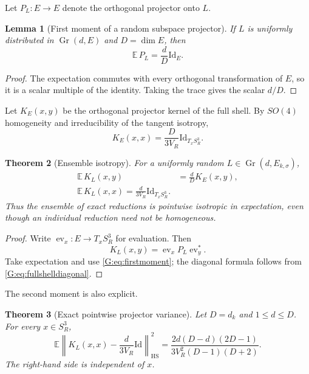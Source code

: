 \documentclass[
 aps,
 prd,
 reprint,
 amsmath,
 amssymb,
 nofootinbib,
 superscriptaddress
]{revtex4-2}
\newtheorem{theorem}{Theorem}[section]
\newtheorem{lemma}[theorem]{Lemma}
\theoremstyle{definition}
\theoremstyle{remark}
\newcommand{\Sthree}{S^3_R}
\newcommand{\Id}{\mathrm{Id}}
\newcommand{\Gr}{\operatorname{Gr}}
\newcommand{\HS}{\mathrm{HS}}
\begin{document}
Let $P_L:E\to E$ denote the orthogonal projector onto $L$.

\begin{lemma}[First moment of a random subspace projector]
\label{G:lem:firstmoment}
If $L$ is uniformly distributed in $\Gr(d,E)$ and $D=\dim E$, then
\begin{equation}
       \mathbb E\,P_L=\frac{d}{D}\Id_E.
       \label{G:eq:firstmoment}
\end{equation}
\end{lemma}

\begin{proof}
The expectation commutes with every orthogonal transformation of $E$, so it
is a scalar multiple of the identity.  Taking the trace gives the scalar
$d/D$.
\end{proof}

Let $K_E(x,y)$ be the orthogonal projector kernel of the full shell.  By
$SO(4)$ homogeneity and irreducibility of the tangent isotropy,
\begin{equation}
       K_E(x,x)
       =
       \frac{D}{3V_R}\Id_{T_x\Sthree}.
       \label{G:eq:fullshelldiagonal}
\end{equation}

\begin{theorem}[Ensemble isotropy]
\label{G:thm:ensembleisotropy}
For a uniformly random $L\in\Gr(d,E_{k,\sigma})$,
\begin{align}
 \mathbb E\,K_L(x,y)
 &=
 \frac{d}{D}K_E(x,y),
 \label{G:eq:meankernel}\\
 \boxed{
 \mathbb E\,K_L(x,x)
 =
 \frac{d}{3V_R}\Id_{T_x\Sthree}.
 }
 \label{G:eq:meandiagonal}
\end{align}
Thus the ensemble of exact reductions is pointwise isotropic in expectation,
even though an individual reduction need not be homogeneous.
\end{theorem}

\begin{proof}
Write $\operatorname{ev}_x:E\to T_x\Sthree$ for evaluation.  Then
\[
 K_L(x,y)
 =
 \operatorname{ev}_x P_L\operatorname{ev}_y^*.
\]
Take expectation and use \eqref{G:eq:firstmoment}; the diagonal formula follows
from \eqref{G:eq:fullshelldiagonal}.
\end{proof}

The second moment is also explicit.

\begin{theorem}[Exact pointwise projector variance]
\label{G:thm:variance}
Let $D=d_k$ and $1\le d\le D$.  For every $x\in\Sthree$,
\begin{equation}
 \boxed{
 \mathbb E
 \left\|
 K_L(x,x)
 -
 \frac{d}{3V_R}\Id
 \right\|_{\HS}^2
 =
 \frac{
 2d(D-d)(2D-1)
 }{
 3V_R^2(D-1)(D+2)
 }.
 }
 \label{G:eq:variance}
\end{equation}
The right-hand side is independent of $x$.
\end{theorem}
\end{document}
